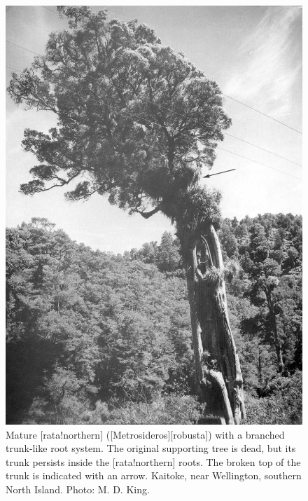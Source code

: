 \begin{figure}[!htb]
	\centering
	\begin{minipage}[t]{0.525\textwidth}
		\centering
		\includegraphics[width=\textwidth]{graphics/figure52rata-branched.jpg}
    	\caption[Mature northern rata with a branched trunk-like root system]{Mature [rata!northern] ([Metrosideros][robusta]) with a branched trunk-like root system.
        The original supporting tree is dead, but its trunk persists inside the [rata!northern] roots.
        The broken top of the trunk is indicated with an arrow.
        Kaitoke, near Wellington, southern North Island.
    	Photo: M. D. King.}%
    	\label{fig:52rata-branched}
	\end{minipage}\hfill%
	\begin{minipage}[t]{0.455\textwidth}
    	\centering

\end{minipage}
\end{figure}
